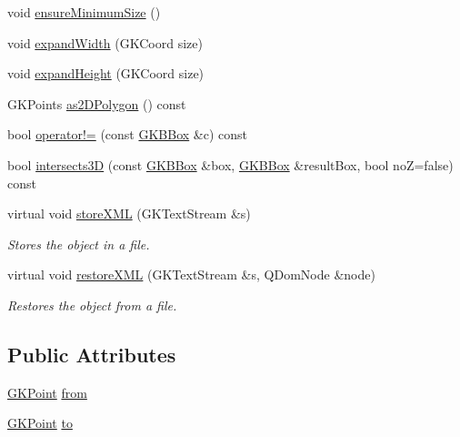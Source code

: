 \begin{DoxyCompactItemize}
\item 
void \hyperlink{classGKBBox_ae6aa2b78ef7ce790e851a4050a9e4645}{ensure\+Minimum\+Size} ()
\item 
void \hyperlink{classGKBBox_ac3ec53960aa45b542901bb33becfd10b}{expand\+Width} (G\+K\+Coord size)
\item 
void \hyperlink{classGKBBox_a6d878f55c35b0fc7fcdba2aa90fd7bb6}{expand\+Height} (G\+K\+Coord size)
\item 
G\+K\+Points \hyperlink{classGKBBox_a7f2422352cdb1a2145d11a7460dbeb0c}{as2\+D\+Polygon} () const 
\item 
bool \hyperlink{classGKBBox_a334b81cfdf382a87f7a38f5783be61db}{operator!=} (const \hyperlink{classGKBBox}{G\+K\+B\+Box} \&c) const 
\item 
bool \hyperlink{classGKBBox_a3190f2a212087bc073c87eb15ebb87d2}{intersects3D} (const \hyperlink{classGKBBox}{G\+K\+B\+Box} \&box, \hyperlink{classGKBBox}{G\+K\+B\+Box} \&result\+Box, bool noZ=false) const 
\item 
virtual void \hyperlink{classGKBBox_a098df9ad0268796d88c75a4cf94c2dce}{store\+X\+ML} (G\+K\+Text\+Stream \&s)\hypertarget{classGKBBox_a098df9ad0268796d88c75a4cf94c2dce}{}\label{classGKBBox_a098df9ad0268796d88c75a4cf94c2dce}

\begin{DoxyCompactList}\small\item\em Stores the object in a file. \end{DoxyCompactList}\item 
virtual void \hyperlink{classGKBBox_a7f34117ddfd461423868fe51ab83de21}{restore\+X\+ML} (G\+K\+Text\+Stream \&s, Q\+Dom\+Node \&node)\hypertarget{classGKBBox_a7f34117ddfd461423868fe51ab83de21}{}\label{classGKBBox_a7f34117ddfd461423868fe51ab83de21}

\begin{DoxyCompactList}\small\item\em Restores the object from a file. \end{DoxyCompactList}\end{DoxyCompactItemize}
\subsection*{Public Attributes}
\begin{DoxyCompactItemize}
\item 
\hyperlink{classGKPoint}{G\+K\+Point} \hyperlink{classGKBBox_aa5b512feaacc7fab5aa6e84bbe6f106f}{from}
\item 
\hyperlink{classGKPoint}{G\+K\+Point} \hyperlink{classGKBBox_af0ec176a4cfaa7731b39858cbb88d6db}{to}
\end{DoxyCompactItemize}
